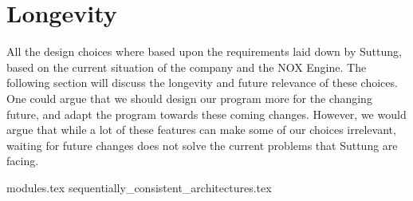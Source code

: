 \section{Longevity}
All the design choices where based upon the requirements laid down by Suttung,
based on the current situation of the company and the NOX Engine.
The following section will discuss the longevity and future relevance of
these choices.
One could argue that we should design our program more for the changing future,
and adapt the program towards these coming changes.
However, we would argue that while a lot of these features can make some of our choices
irrelevant, waiting for future changes does not solve the current problems that
Suttung are facing.

{modules.tex}
{sequentially_consistent_architectures.tex}
